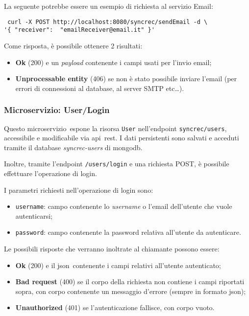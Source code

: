 La seguente potrebbe essere un esempio di richiesta al servizio Email:

\begin{tcolorbox}
	\begin{verbatim} curl -X POST http://localhost:8080/syncrec/sendEmail -d \
'{ "receiver":  "emailReceiver@email.it" }'
	\end{verbatim}
\end{tcolorbox}

Come risposta, è possibile ottenere 2 risultati:
\begin{itemize}
	\item \textbf{Ok} (200) e un \textit{payload} contenente i campi usati
	per l'invio email;
	\item \textbf{Unprocessable entity} (406) se non è stato possibile inviare l'email (per errori di connessioni al database, al server SMTP etc\dots).
\end{itemize}

\subsubsection{Microservizio: User/Login}

Questo \gls{microservizio}\gloss\ espone la risorsa \texttt{User} nell'endpoint
\texttt{syncrec/users}, accessibile e modificabile via \gls{api}\gloss\ \acrshort{rest}. I dati persistenti sono salvati e acceduti tramite il database \textit{syncrec-users} di
\gls{mongodb}\gloss.

Inoltre, tramite l'endpoint \texttt{/users/login} e una richiesta POST,
è possibile effettuare l'operazione di login.

I parametri richiesti nell'operazione di login sono:
\begin{itemize}
	\item \texttt{username}: campo contenente lo \textit{username} o l'email dell'utente che vuole autenticarsi;
	\item \texttt{password}: campo contenente la password relativa all'utente da autenticare.
\end{itemize}

Le possibili risposte che verranno inoltrate al chiamante possono essere:
\begin{itemize}
	\item \textbf{Ok} (200) e il \acrshort{json}\gloss\ contenente i campi relativi all'utente autenticato;
	\item \textbf{Bad request} (400) se il corpo della richiesta non contiene i campi riportati sopra, con corpo contenente un messaggio d'errore (sempre in formato \acrshort{json}\gloss);
	\item \textbf{Unauthorized} (401) se l'autenticazione fallisce, con corpo vuoto.
\end{itemize}


